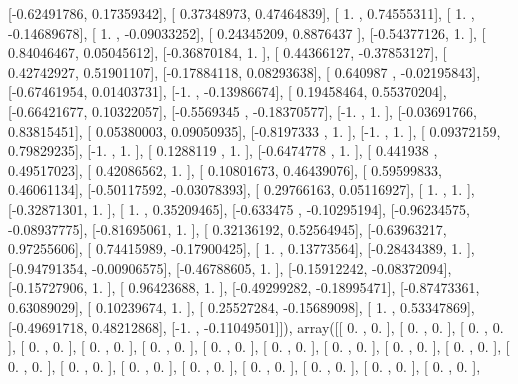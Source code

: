 \documentclass{article}
\begin{document}
       [-0.62491786,  0.17359342],
       [ 0.37348973,  0.47464839],
       [ 1.        ,  0.74555311],
       [ 1.        , -0.14689678],
       [ 1.        , -0.09033252],
       [ 0.24345209,  0.8876437 ],
       [-0.54377126,  1.        ],
       [ 0.84046467,  0.05045612],
       [-0.36870184,  1.        ],
       [ 0.44366127, -0.37853127],
       [ 0.42742927,  0.51901107],
       [-0.17884118,  0.08293638],
       [ 0.640987  , -0.02195843],
       [-0.67461954,  0.01403731],
       [-1.        , -0.13986674],
       [ 0.19458464,  0.55370204],
       [-0.66421677,  0.10322057],
       [-0.5569345 , -0.18370577],
       [-1.        ,  1.        ],
       [-0.03691766,  0.83815451],
       [ 0.05380003,  0.09050935],
       [-0.8197333 ,  1.        ],
       [-1.        ,  1.        ],
       [ 0.09372159,  0.79829235],
       [-1.        ,  1.        ],
       [ 0.1288119 ,  1.        ],
       [-0.6474778 ,  1.        ],
       [ 0.441938  ,  0.49517023],
       [ 0.42086562,  1.        ],
       [ 0.10801673,  0.46439076],
       [ 0.59599833,  0.46061134],
       [-0.50117592, -0.03078393],
       [ 0.29766163,  0.05116927],
       [ 1.        ,  1.        ],
       [-0.32871301,  1.        ],
       [ 1.        ,  0.35209465],
       [-0.633475  , -0.10295194],
       [-0.96234575, -0.08937775],
       [-0.81695061,  1.        ],
       [ 0.32136192,  0.52564945],
       [-0.63963217,  0.97255606],
       [ 0.74415989, -0.17900425],
       [ 1.        ,  0.13773564],
       [-0.28434389,  1.        ],
       [-0.94791354, -0.00906575],
       [-0.46788605,  1.        ],
       [-0.15912242, -0.08372094],
       [-0.15727906,  1.        ],
       [ 0.96423688,  1.        ],
       [-0.49299282, -0.18995471],
       [-0.87473361,  0.63089029],
       [ 0.10239674,  1.        ],
       [ 0.25527284, -0.15689098],
       [ 1.        ,  0.53347869],
       [-0.49691718,  0.48212868],
       [-1.        , -0.11049501]]), array([[ 0.        ,  0.        ],
       [ 0.        ,  0.        ],
       [ 0.        ,  0.        ],
       [ 0.        ,  0.        ],
       [ 0.        ,  0.        ],
       [ 0.        ,  0.        ],
       [ 0.        ,  0.        ],
       [ 0.        ,  0.        ],
       [ 0.        ,  0.        ],
       [ 0.        ,  0.        ],
       [ 0.        ,  0.        ],
       [ 0.        ,  0.        ],
       [ 0.        ,  0.        ],
       [ 0.        ,  0.        ],
       [ 0.        ,  0.        ],
       [ 0.        ,  0.        ],
       [ 0.        ,  0.        ],
       [ 0.        ,  0.        ],
       [ 0.        ,  0.        ],
\end{document}

